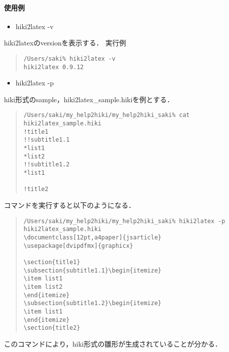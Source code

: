\paragraph{使用例}
\begin{itemize}
\item hiki2latex -v
\end{itemize}
hiki2latexのversionを表示する．
実行例
\begin{quote}\begin{verbatim}
/Users/saki% hiki2latex -v
hiki2latex 0.9.12
\end{verbatim}\end{quote}
\begin{itemize}
\item hiki2latex -p
\end{itemize}
hiki形式のsample，hiki2latex\_sample.hikiを例とする．
\begin{quote}\begin{verbatim}
/Users/saki/my_help2hiki/my_help2hiki_saki% cat hiki2latex_sample.hiki 
!title1
!!subtitle1.1
*list1
*list2
!!subtitle1.2
*list1

!title2
\end{verbatim}\end{quote}
コマンドを実行すると以下のようになる．
\begin{quote}\begin{verbatim}
/Users/saki/my_help2hiki/my_help2hiki_saki% hiki2latex -p hiki2latex_sample.hiki
\documentclass[12pt,a4paper]{jsarticle}
\usepackage[dvipdfmx]{graphicx}

\section{title1}
\subsection{subtitle1.1}\begin{itemize}
\item list1
\item list2
\end{itemize}
\subsection{subtitle1.2}\begin{itemize}
\item list1
\end{itemize}
\section{title2}

\end{verbatim}\end{quote}
このコマンドにより，hiki形式の雛形が生成されていることが分かる．

